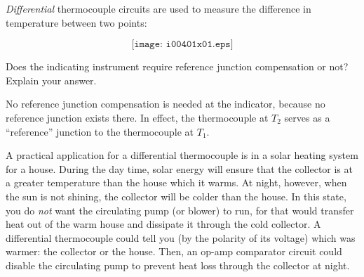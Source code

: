 

{\it Differential} thermocouple circuits are used to measure the difference in temperature between two points:

$$\texttt{[image: i00401x01.eps]}$$

Does the indicating instrument require reference junction compensation or not?  Explain your answer.







No reference junction compensation is needed at the indicator, because no reference junction exists there.  In effect, the thermocouple at $T_2$ serves as a ``reference'' junction to the thermocouple at $T_1$.

A practical application for a differential thermocouple is in a solar heating system for a house.  During the day time, solar energy will ensure that the collector is at a greater temperature than the house which it warms.  At night, however, when the sun is not shining, the collector will be colder than the house.  In this state, you do {\it not} want the circulating pump (or blower) to run, for that would transfer heat out of the warm house and dissipate it through the cold collector.  A differential thermocouple could tell you (by the polarity of its voltage) which was warmer: the collector or the house.  Then, an op-amp comparator circuit could disable the circulating pump to prevent heat loss through the collector at night.











